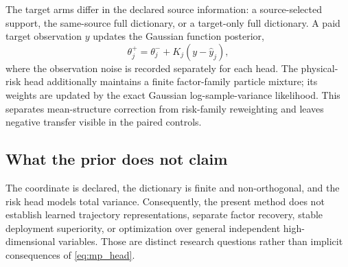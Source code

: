 The target arms differ in the declared source information: a source-selected
support, the same-source full dictionary, or a target-only full dictionary.
A paid target observation $y$ updates the Gaussian function posterior,
\begin{equation}
 \theta_j^+ = \theta_j^-+K_j(y-\hat y_j),
 \label{eq:mp_update}
\end{equation}
where the observation noise is recorded separately for each head.  The
physical-risk head additionally maintains a finite factor-family particle
mixture; its weights are updated by the exact Gaussian log-sample-variance
likelihood.  This separates mean-structure correction from risk-family
reweighting and leaves negative transfer visible in the paired controls.

\subsection{What the prior does not claim}

The coordinate is declared, the dictionary is finite and non-orthogonal, and
the risk head models total variance.  Consequently, the present method does
not establish learned trajectory representations, separate factor recovery,
stable deployment superiority, or optimization over general independent
high-dimensional variables.  Those are distinct research questions rather
than implicit consequences of \eqref{eq:mp_head}.
